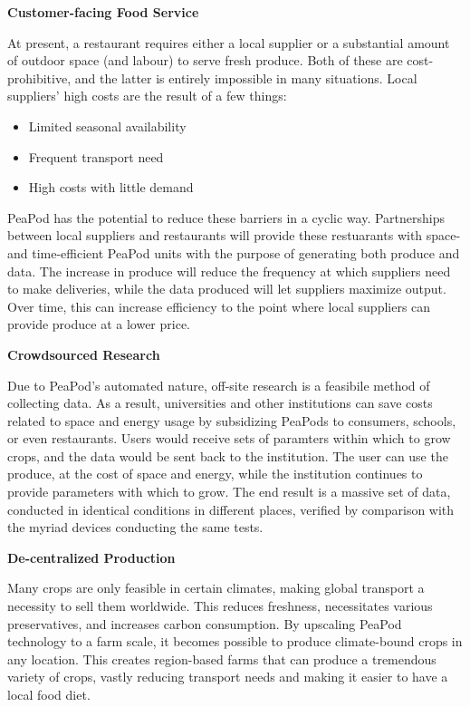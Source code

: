 \documentclass{report}
\begin{document}

\textbf{Customer-facing Food Service} %

At present, a restaurant requires either a local supplier or a substantial amount of outdoor space (and labour) to serve fresh produce. Both of these are cost-prohibitive, and the latter is entirely impossible in many situations. Local suppliers' high costs are the result of a few things:
\begin{itemize}
    \item Limited seasonal availability
    \item Frequent transport need
    \item High costs with little demand
\end{itemize}
PeaPod has the potential to reduce these barriers in a cyclic way. Partnerships between local suppliers and restaurants will provide these restuarants with space- and time-efficient PeaPod units with the purpose of generating both produce and data. The increase in produce will reduce the frequency at which suppliers need to make deliveries, while the data produced will let suppliers maximize output. Over time, this can increase efficiency to the point where local suppliers can provide produce at a lower price.

\textbf{Crowdsourced Research} %

Due to PeaPod's automated nature, off-site research is a feasibile method of collecting data. As a result, universities and other institutions can save costs related to space and energy usage by subsidizing PeaPods to consumers, schools, or even restaurants. Users would receive sets of paramters within which to grow crops, and the data would be sent back to the institution. The user can use the produce, at the cost of space and energy, while the institution continues to provide parameters with which to grow. The end result is a massive set of data, conducted in identical conditions in different places, verified by comparison with the myriad devices conducting the same tests.

\textbf{De-centralized Production} %

Many crops are only feasible in certain climates, making global transport a necessity to sell them worldwide. This reduces freshness, necessitates various preservatives, and increases carbon consumption. By upscaling PeaPod technology to a farm scale, it becomes possible to produce climate-bound crops in any location. This creates region-based farms that can produce a tremendous variety of crops, vastly reducing transport needs and making it easier to have a local food diet.
\end{document}

